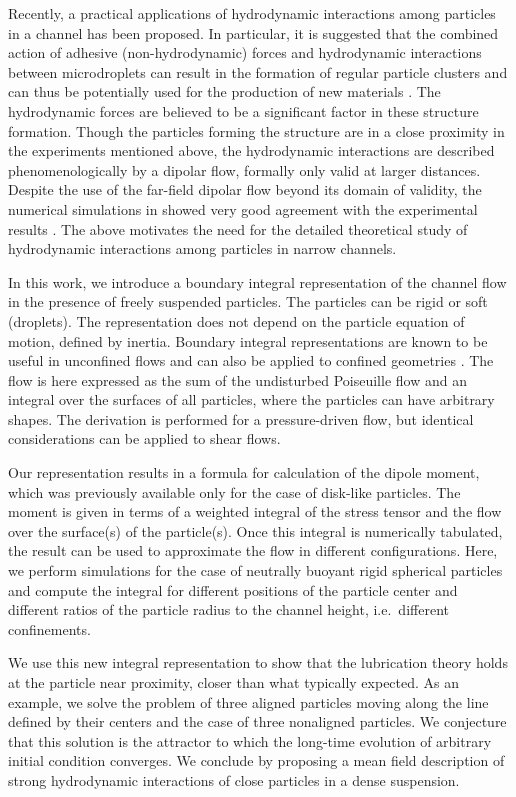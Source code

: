 Recently, a practical applications of hydrodynamic interactions among particles in a channel has been proposed. In particular, it is suggested that the combined action of adhesive (non-hydrodynamic) forces and hydrodynamic interactions between microdroplets can result in the formation of regular particle clusters and can thus be potentially used for the production of new materials \cite{tab0,tabeling}. The hydrodynamic forces are believed to be a significant factor in these structure formation. Though the particles 
forming the structure are in a close proximity in the experiments mentioned above, the hydrodynamic interactions are described phenomenologically by a dipolar flow, formally only valid at larger distances. Despite the use of the far-field dipolar flow beyond its domain of validity, the numerical simulations  in \cite{tab0} showed very good agreement with the experimental results \cite{tabeling}. The above motivates the need for the detailed theoretical study of hydrodynamic interactions among particles in narrow channels.

In this work, we introduce a boundary integral representation of the channel flow in the presence of freely suspended particles. The particles can be rigid or soft (droplets).
The representation does not depend on the particle equation of motion, defined by inertia.
Boundary integral representations are known to be useful in unconfined flows and can also be applied to confined geometries  \cite{hb,ps}.
The flow is here expressed as the sum of the undisturbed Poiseuille flow and an integral over the surfaces of all particles, where the particles can have arbitrary shapes.
The derivation is performed for a pressure-driven flow, but identical considerations can be applied to shear flows.

Our representation results in a formula for calculation of the dipole moment, which was previously available only for the case of disk-like particles. The moment is given in terms of a weighted integral of the
stress tensor and the  flow over the surface(s) of the particle(s). Once this integral is numerically tabulated, the result can be used to approximate the flow in different configurations. Here, we perform simulations for the case of neutrally buoyant rigid spherical particles and compute the integral for different positions of the particle center and different ratios of the particle radius to the channel height, i.e.\ different confinements.

We use this new integral representation to show that the lubrication theory holds at the particle near proximity, closer than what typically expected. As an example, we solve the problem of three aligned particles moving along the line defined by their centers and  the case of three nonaligned particles.
We conjecture that this solution is the attractor to which the long-time evolution of arbitrary initial condition converges. We conclude by proposing a mean field description of strong hydrodynamic interactions of close
particles in a dense suspension.

